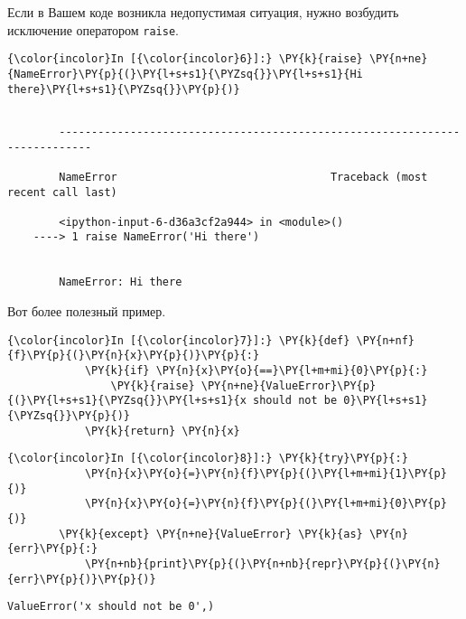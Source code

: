     Если в Вашем коде возникла недопустимая ситуация, нужно возбудить
исключение оператором \texttt{raise}.

    \begin{Verbatim}[commandchars=\\\{\}]
{\color{incolor}In [{\color{incolor}6}]:} \PY{k}{raise} \PY{n+ne}{NameError}\PY{p}{(}\PY{l+s+s1}{\PYZsq{}}\PY{l+s+s1}{Hi there}\PY{l+s+s1}{\PYZsq{}}\PY{p}{)}
\end{Verbatim}

    \begin{Verbatim}[commandchars=\\\{\}]

        ---------------------------------------------------------------------------

        NameError                                 Traceback (most recent call last)

        <ipython-input-6-d36a3cf2a944> in <module>()
    ----> 1 raise NameError('Hi there')
    

        NameError: Hi there

    \end{Verbatim}

    Вот более полезный пример.

    \begin{Verbatim}[commandchars=\\\{\}]
{\color{incolor}In [{\color{incolor}7}]:} \PY{k}{def} \PY{n+nf}{f}\PY{p}{(}\PY{n}{x}\PY{p}{)}\PY{p}{:}
            \PY{k}{if} \PY{n}{x}\PY{o}{==}\PY{l+m+mi}{0}\PY{p}{:}
                \PY{k}{raise} \PY{n+ne}{ValueError}\PY{p}{(}\PY{l+s+s1}{\PYZsq{}}\PY{l+s+s1}{x should not be 0}\PY{l+s+s1}{\PYZsq{}}\PY{p}{)}
            \PY{k}{return} \PY{n}{x}
\end{Verbatim}

    \begin{Verbatim}[commandchars=\\\{\}]
{\color{incolor}In [{\color{incolor}8}]:} \PY{k}{try}\PY{p}{:}
            \PY{n}{x}\PY{o}{=}\PY{n}{f}\PY{p}{(}\PY{l+m+mi}{1}\PY{p}{)}
            \PY{n}{x}\PY{o}{=}\PY{n}{f}\PY{p}{(}\PY{l+m+mi}{0}\PY{p}{)}
        \PY{k}{except} \PY{n+ne}{ValueError} \PY{k}{as} \PY{n}{err}\PY{p}{:}
            \PY{n+nb}{print}\PY{p}{(}\PY{n+nb}{repr}\PY{p}{(}\PY{n}{err}\PY{p}{)}\PY{p}{)}
\end{Verbatim}

    \begin{Verbatim}[commandchars=\\\{\}]
ValueError('x should not be 0',)

    \end{Verbatim}

